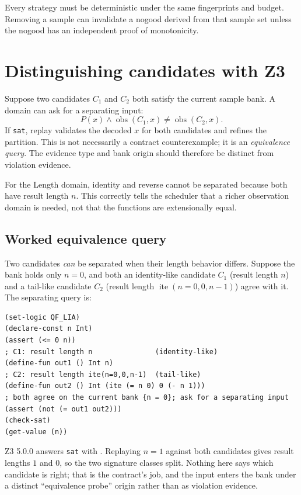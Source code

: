 \documentclass[10pt,letterpaper,oneside]{report}
\newcommand{\code}[1]{\texttt{\detokenize{#1}}}
\newcommand{\sat}{\texttt{sat}}
\begin{document}
Every strategy must be deterministic under the same fingerprints and budget. Removing a sample can invalidate a nogood derived from that sample set unless the nogood has an independent proof of monotonicity.

\section{Distinguishing candidates with Z3}

Suppose two candidates $C_1$ and $C_2$ both satisfy the current sample bank. A domain can ask for a separating input:
\[
  P(x)\land
  \operatorname{obs}(C_1,x)\ne\operatorname{obs}(C_2,x).
\]
If \sat{}, replay validates the decoded $x$ for both candidates and refines the partition. This is not necessarily a contract counterexample; it is an \emph{equivalence query}. The evidence type and bank origin should therefore be distinct from violation evidence.

For the Length domain, identity and reverse cannot be separated because both have result length $n$. This correctly tells the scheduler that a richer observation domain is needed, not that the functions are extensionally equal.
\subsection*{Worked equivalence query}
\label{sec:equivalence-worked}

Two candidates \emph{can} be separated when their length behavior differs. Suppose the bank holds only $n=0$, and both an identity-like candidate $C_1$ (result length $n$) and a tail-like candidate $C_2$ (result length $\operatorname{ite}(n=0,0,n-1)$) agree with it. The separating query is:

\begin{lstlisting}[language=SMTLib,caption={An equivalence query separating two candidates that agree on the current bank.}]
(set-logic QF_LIA)
(declare-const n Int)
(assert (<= 0 n))
; C1: result length n               (identity-like)
(define-fun out1 () Int n)
; C2: result length ite(n=0,0,n-1)  (tail-like)
(define-fun out2 () Int (ite (= n 0) 0 (- n 1)))
; both agree on the current bank {n = 0}; ask for a separating input
(assert (not (= out1 out2)))
(check-sat)
(get-value (n))
\end{lstlisting}

Z3 5.0.0 answers \sat{} with \code{((n 1))}. Replaying $n=1$ against both candidates gives result lengths $1$ and $0$, so the two signature classes split. Nothing here says which candidate is right; that is the contract's job, and the input enters the bank under a distinct ``equivalence probe'' origin rather than as violation evidence.
\end{document}
